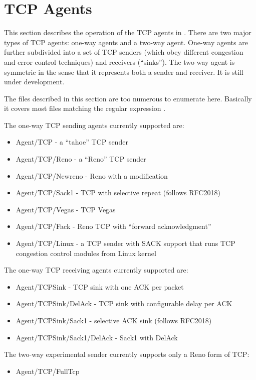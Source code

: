 \chapter{TCP Agents}
\label{sec:tcpAgents}

This section describes the operation of the TCP agents in \ns.
There are two major types of TCP agents: one-way agents
and a two-way agent.
One-way agents are further subdivided into a set of TCP senders
(which obey different congestion and error control techniques)
and receivers (``sinks'').
The two-way agent is symmetric in the sense that it represents
both a sender and receiver.
It is still under development.

The files described in this section are too numerous to enumerate here.
Basically it covers most files matching the regular expression
.

The one-way TCP sending agents currently supported are:
\begin{itemize}\itemsep0pt
        \item Agent/TCP - a ``tahoe'' TCP sender
        \item Agent/TCP/Reno - a ``Reno'' TCP sender
        \item Agent/TCP/Newreno - Reno with a modification
        \item Agent/TCP/Sack1 - TCP with selective repeat (follows RFC2018)
        \item Agent/TCP/Vegas - TCP Vegas
        \item Agent/TCP/Fack - Reno TCP with ``forward acknowledgment''
	\item Agent/TCP/Linux - a TCP sender with SACK support that runs TCP congestion control modules from Linux kernel
\end{itemize}
The one-way TCP receiving agents currently supported are:
\begin{itemize}\itemsep0pt
        \item Agent/TCPSink - TCP sink with one ACK per packet
        \item Agent/TCPSink/DelAck - TCP sink with configurable delay per ACK
        \item Agent/TCPSink/Sack1 - selective ACK sink (follows RFC2018)
        \item Agent/TCPSink/Sack1/DelAck - Sack1 with DelAck
\end{itemize}
The two-way experimental sender currently supports only a Reno form of TCP:
\begin{itemize}
        \item Agent/TCP/FullTcp
\end{itemize}

